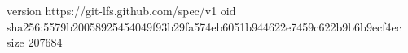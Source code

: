 version https://git-lfs.github.com/spec/v1
oid sha256:5579b20058925454049f93b29fa574eb6051b944622e7459c622b9b6b9ecf4ec
size 207684

